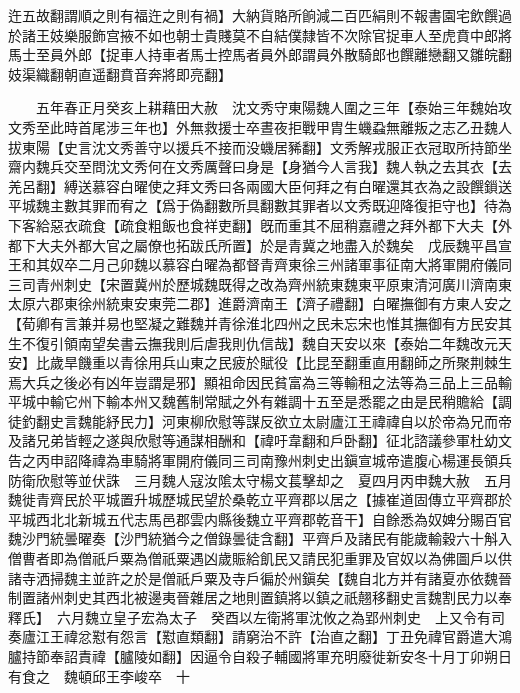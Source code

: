 迕五故翻謂順之則有福迕之則有禍】大納貨賂所餉減二百匹絹則不報書園宅飲饌過於諸王妓樂服飾宫掖不如也朝士貴賤莫不自結僕隸皆不次除官捉車人至虎賁中郎將馬士至員外郎【捉車人持車者馬士控馬者員外郎謂員外散騎郎也饌離戀翻又雛皖翻妓渠織翻朝直遥翻賁音奔將即亮翻】

　　五年春正月癸亥上耕藉田大赦　沈文秀守東陽魏人圍之三年【泰始三年魏始攻文秀至此時首尾涉三年也】外無救援士卒晝夜拒戰甲胄生蟣蝨無離叛之志乙丑魏人拔東陽【史言沈文秀善守以援兵不接而没蟣居豨翻】文秀解戎服正衣冠取所持節坐齋内魏兵交至問沈文秀何在文秀厲聲曰身是【身猶今人言我】魏人執之去其衣【去羌呂翻】縛送慕容白曜使之拜文秀曰各兩國大臣何拜之有白曜還其衣為之設饌鎻送平城魏主數其罪而宥之【爲于偽翻數所具翻數其罪者以文秀既迎降復拒守也】待為下客給惡衣疏食【疏食粗飯也食祥吏翻】旣而重其不屈稍嘉禮之拜外都下大夫【外都下大夫外都大官之屬僚也拓跋氏所置】於是青冀之地盡入於魏矣　戊辰魏平昌宣王和其奴卒二月己卯魏以慕容白曜為都督青齊東徐三州諸軍事征南大將軍開府儀同三司青州刺史【宋置冀州於歷城魏既得之改為齊州統東魏東平原東清河廣川濟南東太原六郡東徐州統東安東莞二郡】進爵濟南王【濟子禮翻】白曜撫御有方東人安之【荀卿有言兼并易也堅凝之難魏并青徐淮北四州之民未忘宋也惟其撫御有方民安其生不復引領南望矣書云撫我則后虐我則仇信哉】魏自天安以來【泰始二年魏改元天安】比歲旱饑重以青徐用兵山東之民疲於賦役【比昆至翻重直用翻師之所聚荆棘生焉大兵之後必有凶年豈謂是邪】顯祖命因民貧富為三等輸租之法等為三品上三品輸平城中輸它州下輸本州又魏舊制常賦之外有雜調十五至是悉罷之由是民稍贍給【調徒釣翻史言魏能紓民力】河東柳欣慰等謀反欲立太尉廬江王禕禕自以於帝為兄而帝及諸兄弟皆輕之遂與欣慰等通謀相酬和【禕吁韋翻和戶卧翻】征北諮議參軍杜幼文告之丙申詔降禕為車騎將軍開府儀同三司南豫州刺史出鎭宣城帝遣腹心楊運長領兵防衛欣慰等並伏誅　三月魏人寇汝隂太守楊文萇擊却之　夏四月丙申魏大赦　五月魏徙青齊民於平城置升城歷城民望於桑乾立平齊郡以居之【據崔道固傳立平齊郡於平城西北北新城五代志馬邑郡雲内縣後魏立平齊郡乾音干】自餘悉為奴婢分賜百官魏沙門統曇曜奏【沙門統猶今之僧錄曇徒含翻】平齊戶及諸民有能歲輸穀六十斛入僧曹者即為僧祇戶粟為僧祇粟遇凶歲賑給飢民又請民犯重罪及官奴以為佛圖戶以供諸寺洒掃魏主並許之於是僧祇戶粟及寺戶徧於州鎭矣【魏自北方并有諸夏亦依魏晉制置諸州刺史其西北被邊夷晉雜居之地則置鎮將以鎮之祇翹移翻史言魏割民力以奉釋氏】　六月魏立皇子宏為太子　癸酉以左衛將軍沈攸之為郢州刺史　上又令有司奏廬江王禕忿懟有怨言【懟直類翻】請窮治不許【治直之翻】丁丑免禕官爵遣大鴻臚持節奉詔責禕【臚陵如翻】因逼令自殺子輔國將軍充明廢徙新安冬十月丁卯朔日有食之　魏頓邱王李峻卒　十

